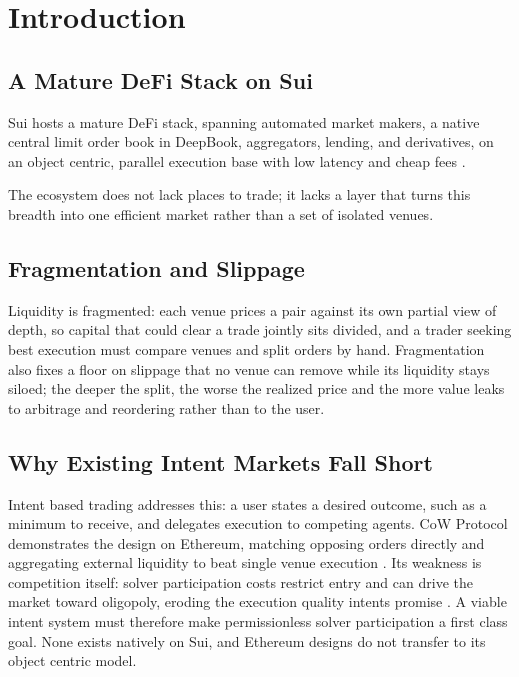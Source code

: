 \documentclass[10pt,sigconf,nonacm]{acmart}
\theoremstyle{reiythm}
\begin{document}
\maketitle


\section{Introduction}

\subsection{A Mature DeFi Stack on Sui}

Sui hosts a mature DeFi stack, spanning automated market makers, a native central
limit order book in DeepBook, aggregators, lending, and derivatives, on an object
centric, parallel execution base with low latency and cheap fees \cite{suidefistack}.

The ecosystem does not lack places to trade; it lacks a layer that turns this
breadth into one efficient market rather than a set of isolated venues.

\subsection{Fragmentation and Slippage}

Liquidity is fragmented: each venue prices a pair against its own partial view of
depth, so capital that could clear a trade jointly sits divided, and a trader
seeking best execution must compare venues and split orders by hand. Fragmentation
also fixes a floor on slippage that no venue can remove while its liquidity stays
siloed; the deeper the split, the worse the realized price and the more value leaks
to arbitrage and reordering rather than to the user.

\subsection{Why Existing Intent Markets Fall Short}

Intent based trading addresses this: a user states a desired outcome, such as a
minimum to receive, and delegates execution to competing agents. CoW Protocol
demonstrates the design on Ethereum, matching opposing orders directly and
aggregating external liquidity to beat single venue execution
\cite{documentationcowdaoe}. Its weakness is competition itself: solver
participation costs restrict entry and can drive the market toward oligopoly,
eroding the execution quality intents promise
\cite{chitra2024analysisintentbasedmarkets}. A viable intent system must therefore
make permissionless solver participation a first class goal. None exists natively on
Sui, and Ethereum designs do not transfer to its object centric model.
\end{document}
